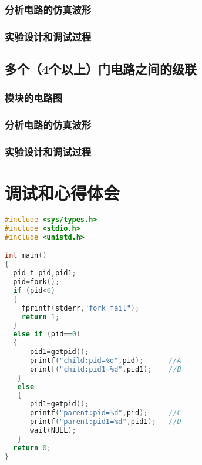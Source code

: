 \documentclass[14pt, b5paper, sourcefont]{qyxf-report-large}
\begin{document}
\subsubsection{分析电路的仿真波形}
\subsubsection{实验设计和调试过程}

\subsection{多个（4个以上）门电路之间的级联}
\subsubsection{模块的电路图}
\subsubsection{分析电路的仿真波形}
\subsubsection{实验设计和调试过程}

\section{调试和心得体会}
\begin{lstlisting}[language=c]
#include <sys/types.h>
#include <stdio.h>
#include <unistd.h>

int main()
{
  pid_t pid,pid1;
  pid=fork();
  if (pid<0)
  {
    fprintf(stderr,"fork fail");
    return 1;
  }
  else if (pid==0)
  {
      pid1=getpid();
      printf("child:pid=%d",pid);      //A
      printf("child:pid1=%d",pid1);    //B
   }
   else
   {
      pid1=getpid();
      printf("parent:pid=%d",pid);     //C
      printf("parent:pid1=%d",pid1);   //D
      wait(NULL);
   }
  return 0;
}
\end{lstlisting}
\end{document}
